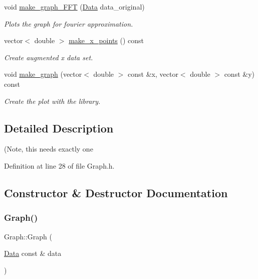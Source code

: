 \begin{DoxyCompactItemize}
void \mbox{\hyperlink{class_graph_a5326be30b090c2ba956d0e0211895fcd}{make\+\_\+graph\+\_\+\+F\+FT}} (\mbox{\hyperlink{struct_data}{Data}} data\+\_\+original)
\begin{DoxyCompactList}\small\item\em Plots the graph for fourier approximation. \end{DoxyCompactList}\item 
vector$<$ double $>$ \mbox{\hyperlink{class_graph_a74825a258c65f3706369b367874b7f7b}{make\+\_\+x\+\_\+points}} () const
\begin{DoxyCompactList}\small\item\em Create augmented x data set. \end{DoxyCompactList}\item 
void \mbox{\hyperlink{class_graph_ac179fa82679466194ea2a396d4382904}{make\+\_\+graph}} (vector$<$ double $>$ const \&x, vector$<$ double $>$ const \&y) const
\begin{DoxyCompactList}\small\item\em Create the plot with the library. \end{DoxyCompactList}\end{DoxyCompactItemize}


\subsection{Detailed Description}
(Note, this needs exactly one 

Definition at line 28 of file Graph.\+h.



\subsection{Constructor \& Destructor Documentation}
\mbox{\label{class_graph_ac2cc4f7971589f9674f4fbf3b7dc200c}} 
\subsubsection{\texorpdfstring{Graph()}{Graph()}}
{\footnotesize\ttfamily Graph\+::\+Graph (\begin{DoxyParamCaption}\item[{\mbox{\hyperlink{struct_data}{Data}} const \&}]{data }\end{DoxyParamCaption})\hspace{0.3cm}{\ttfamily [explicit]}}



